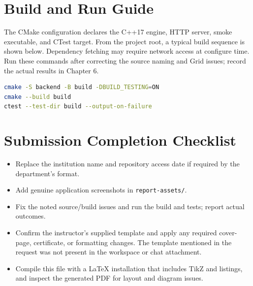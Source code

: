 \documentclass[12pt,a4paper]{report}
\begin{document}
\appendix
\chapter{Build and Run Guide}
The CMake configuration declares the C++17 engine, HTTP server, smoke
executable, and CTest target. From the project root, a typical build sequence
is shown below. Dependency fetching may require network access at configure
time. Run these commands after correcting the source naming and Grid issues;
record the actual results in Chapter 6.
\begin{lstlisting}[language=bash,basicstyle=\ttfamily\small]
cmake -S backend -B build -DBUILD_TESTING=ON
cmake --build build
ctest --test-dir build --output-on-failure
\end{lstlisting}

\chapter{Submission Completion Checklist}
\begin{itemize}[leftmargin=*]
  \item Replace the institution name and repository access date if required by
        the department's format.
  \item Add genuine application screenshots in \texttt{report-assets/}.
  \item Fix the noted source/build issues and run the build and tests; report
        actual outcomes.
  \item Confirm the instructor's supplied template and apply any required
        cover-page, certificate, or formatting changes. The template mentioned
        in the request was not present in the workspace or chat attachment.
  \item Compile this file with a LaTeX installation that includes TikZ and
        listings, and inspect the generated PDF for layout and diagram issues.
\end{itemize}
\end{document}
